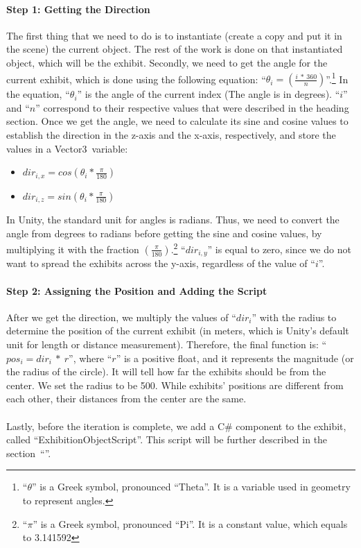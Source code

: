 \paragraph{Step 1: Getting the Direction}
The first thing that we need to do is to instantiate (create a copy and put it in the scene) the current object. The rest of the work is done on that instantiated object, which will be the exhibit. Secondly, we need to get the angle for the current exhibit, which is done using the following equation: “$\theta_i = \left(\frac{i \ * \ 360}{n}\right)$”.\footnote{“$\theta$” is a Greek symbol, pronounced “Theta”. It is a variable used in geometry to represent angles.}  In the equation, “$\theta_i$” is the angle of the current index (The angle is in degrees). “$i$” and “$n$” correspond to their respective values that were described in the heading section. Once we get the angle, we need to calculate its sine and cosine values to establish the direction in the z-axis and the x-axis, respectively, and store the values in a Vector3\normalfont \ variable:
\begin{itemize}
    \item {$dir_{i, x} = cos\left(\theta_i * \frac{\pi}{180}\right)$}
    \item {$dir_{i, z} = sin\left(\theta_i * \frac{\pi}{180}\right)$}
 \end{itemize}
In Unity, the standard unit for angles is radians. Thus, we need to convert the angle from degrees to radians before getting the sine and cosine values, by multiplying it with the fraction $\left(\frac{\pi}{180}\right)$.\footnote{“$\pi$” is a Greek symbol, pronounced “Pi”. It is a constant value, which equals to 3.141592}  “$dir_{i, y}$” is equal to zero, since we do not want to spread the exhibits across the y-axis, regardless of the value of “$i$”.


\paragraph*{Step 2: Assigning the Position and Adding the Script}
After we get the direction, we multiply the values of “$dir_i$” with the radius to determine the position of the current exhibit (in meters, which is Unity’s default unit for length or distance measurement). Therefore, the final function is: “$pos_i = dir_i \ * \ r$”, where “$r$” is a positive float, and it represents the magnitude (or the radius of the circle). It will tell how far the exhibits should be from the center. We set the radius to be 500. While exhibits' positions are different from each other, their distances from the center are the same.
\\ \\
Lastly, before the iteration is complete, we add a C\# component to the exhibit, called “ExhibitionObjectScript\normalfont”. This script will be further described in the section~“\textbf{}”.

